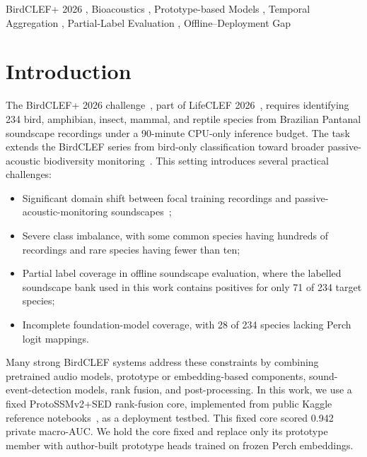 \documentclass{ceurart}
\begin{document}
\begin{keywords}
  BirdCLEF+ 2026 \sep
  Bioacoustics \sep
  Prototype-based Models \sep
  Temporal Aggregation \sep
  Partial-Label Evaluation \sep
  Offline--Deployment Gap
\end{keywords}

\maketitle

\section{Introduction}

The BirdCLEF+ 2026 challenge~\cite{birdclef2026}, part of LifeCLEF 2026~\cite{lifeclef2026}, requires identifying 234 bird, amphibian, insect, mammal, and reptile species from Brazilian Pantanal soundscape recordings under a 90-minute CPU-only inference budget. The task extends the BirdCLEF series from bird-only classification toward broader passive-acoustic biodiversity monitoring~\cite{kahl2024birdclef,kahl2025birdclef}. This setting introduces several practical challenges:

\begin{itemize}
\item Significant domain shift between focal training recordings and passive-acoustic-monitoring soundscapes~\cite{ganin2015domain};
\item Severe class imbalance, with some common species having hundreds of recordings and rare species having fewer than ten;
\item Partial label coverage in offline soundscape evaluation, where the labelled soundscape bank used in this work contains positives for only 71 of 234 target species;
\item Incomplete foundation-model coverage, with 28 of 234 species lacking Perch~\cite{ghani2023global} logit mappings.
\end{itemize}

Many strong BirdCLEF systems address these constraints by combining pretrained audio models, prototype or embedding-based components, sound-event-detection models, rank fusion, and post-processing. In this work, we use a fixed ProtoSSMv2+SED rank-fusion core, implemented from public Kaggle reference notebooks~\cite{protossmv2}, as a deployment testbed. This fixed core scored 0.942 private macro-AUC. We hold the core fixed and replace only its prototype member with author-built prototype heads trained on frozen Perch embeddings.
\end{document}
